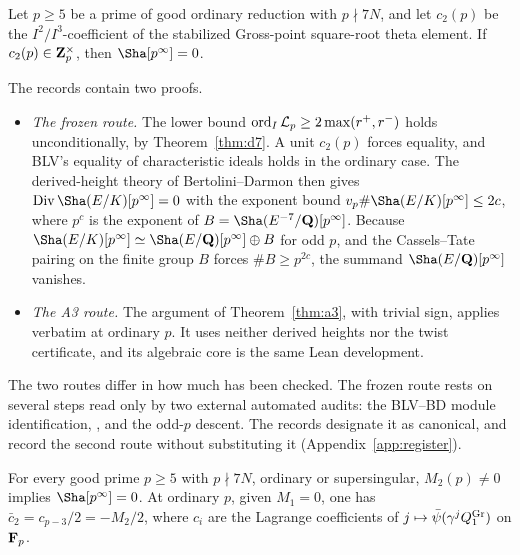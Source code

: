 \begin{theorem}\label{thm:ordbridge}
Let $p\ge5$ be a prime of good ordinary reduction with $p\nmid7N$, and let $c_2(p)$ be the $I^2/I^3$-coefficient of the stabilized Gross-point square-root theta element. If $c_2(p)\in\mathbf{Z}_p^\times$, then $\Sha[p^\infty]=0$.
\end{theorem}
The records contain two proofs.
\begin{itemize}[leftmargin=*]
\item \emph{The frozen route.} The lower bound $\operatorname{ord}_I\mathcal L_p\ge2\max(r^+,r^-)$ \cite[Cor.~3]{bd05} holds unconditionally, by Theorem~\ref{thm:d7}. A unit $c_2(p)$ forces equality, and BLV's equality of characteristic ideals holds in the ordinary case. The derived-height theory of Bertolini--Darmon \cite{bdheights} then gives $\mathrm{Div}\,\Sha(E/K)[p^\infty]=0$ with the exponent bound $v_p\#\Sha(E/K)[p^\infty]\le2c$, where $p^c$ is the exponent of $B=\Sha(E^{-7}/\Q)[p^\infty]$. Because $\Sha(E/K)[p^\infty]\simeq\Sha(E/\Q)[p^\infty]\oplus B$ for odd $p$, and the Cassels--Tate pairing on the finite group $B$ forces $\#B\ge p^{2c}$, the summand $\Sha(E/\Q)[p^\infty]$ vanishes.
\item \emph{The A3 route.} The argument of Theorem~\ref{thm:a3}, with trivial sign, applies verbatim at ordinary $p$. It uses neither derived heights nor the twist certificate, and its algebraic core is the same Lean development.
\end{itemize}
The two routes differ in how much has been checked. The frozen route rests on several steps read only by two external automated audits: the BLV--BD module identification, \cite[Thms.~2.18(5), 2.23, Lemma~3.1]{bdheights}, and the odd-$p$ descent. The records designate it as canonical, and record the second route without substituting it (Appendix~\ref{app:register}).

\begin{corollary}\label{cor:unified}
For every good prime $p\ge5$ with $p\nmid7N$, ordinary or supersingular, $M_2(p)\neq0$ implies $\Sha[p^\infty]=0$. At ordinary $p$, given $M_1=0$, one has $\bar c_2=c_{p-3}/2=-M_2/2$, where $c_i$ are the Lagrange coefficients of $j\mapsto\bar\psi(\gamma^jQ^{\rm Gr}_1)$ on $\mathbf{F}_p$.
\end{corollary}

